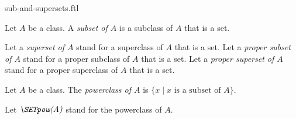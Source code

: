 \documentclass{naproche-library}
\begin{document}
\begin{smodule}[title=Sub- and Supersets]{sub-and-supersets.ftl}

\begin{definition}[forthel,id=FOUNDATIONS_10_1346889551183872]
  Let $A$ be a class.
  A \emph{subset of $A$} is a subclass of $A$ that is a set.

  Let a \emph{superset of $A$} stand for a superclass of $A$ that is a set.
  Let a \emph{proper subset of $A$} stand for a proper subclass of $A$ that is a set.
  Let a \emph{proper superset of $A$} stand for a proper superclass of $A$ that is a set.
\end{definition}

\begin{definition}[forthel,id=FOUNDATIONS_10_1448589907722240]
  Let $A$ be a class.
  The \emph{powerclass of $A$} is $\{ x \mid x\text{ is a subset of }A \}$.

  Let $\emph{\SETpow(A)}$ stand for the powerclass of $A$.
\end{definition}
\end{smodule}
\end{document}
